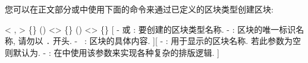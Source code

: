 
您可以在正文部分或中使用下面的命令来通过已定义的区块类型创建区块:

< , >{
    \{\}
    ()
    <>
    \{\longarg\}
    \AnotherUsage
    ()
    <>
    \{\longarg\}
}[
    -  或  : 要创建的区块类型名称.
    -  : 区块的唯一标识名称, 请勿以 \texttt{.} 开头.
    - \longarg\ : 区块的具体内容.
][
    -  : 用于显示的区块名称. 若此参数为空则默认为.
    -  : 在中使用该参数来实现各种复杂的排版逻辑.
]

\AutomaticListoff

